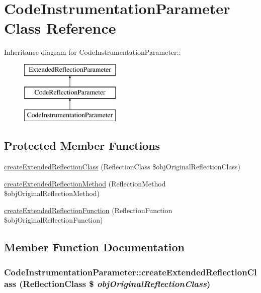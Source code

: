 \hypertarget{class_code_instrumentation_parameter}{
\section{CodeInstrumentationParameter Class Reference}
\label{class_code_instrumentation_parameter}
}
Inheritance diagram for CodeInstrumentationParameter::\begin{figure}[H]
\begin{center}
\leavevmode
\includegraphics[height=3cm]{class_code_instrumentation_parameter}
\end{center}
\end{figure}
\subsection*{Protected Member Functions}
\begin{CompactItemize}
\item 
\hyperlink{class_code_instrumentation_parameter_4190025f9ec55f58f10b36084a8851fd}{createExtendedReflectionClass} (ReflectionClass \$objOriginalReflectionClass)
\item 
\hyperlink{class_code_instrumentation_parameter_e0c68e69aa93979e2e1fa3057bd39d5a}{createExtendedReflectionMethod} (ReflectionMethod \$objOriginalReflectionMethod)
\item 
\hyperlink{class_code_instrumentation_parameter_e9723a389b48bdb31fc49f784692aecf}{createExtendedReflectionFunction} (ReflectionFunction \$objOriginalReflectionFunction)
\end{CompactItemize}


\subsection{Member Function Documentation}
\hypertarget{class_code_instrumentation_parameter_4190025f9ec55f58f10b36084a8851fd}{
\subsubsection[{createExtendedReflectionClass}]{\setlength{\rightskip}{0pt plus 5cm}CodeInstrumentationParameter::createExtendedReflectionClass (ReflectionClass \$ {\em objOriginalReflectionClass})}}
\label{class_code_instrumentation_parameter_4190025f9ec55f58f10b36084a8851fd}


